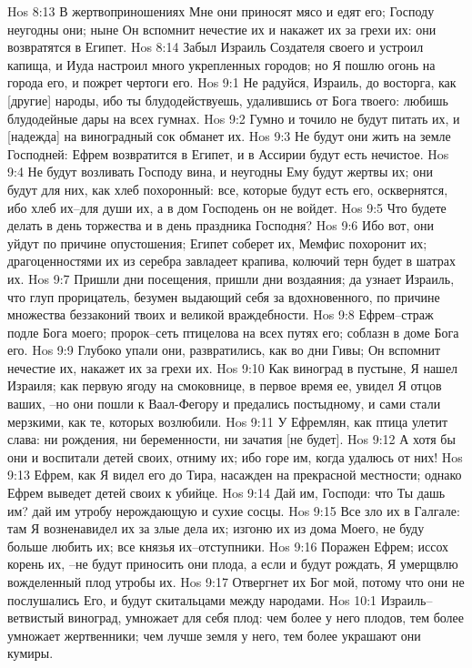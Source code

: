 Hos 8:13  В жертвоприношениях Мне они приносят мясо и едят его; Господу неугодны они; ныне Он вспомнит нечестие их и накажет их за грехи их: они возвратятся в Египет.
Hos 8:14  Забыл Израиль Создателя своего и устроил капища, и Иуда настроил много укрепленных городов; но Я пошлю огонь на города его, и пожрет чертоги его.
Hos 9:1  Не радуйся, Израиль, до восторга, как [другие] народы, ибо ты блудодействуешь, удалившись от Бога твоего: любишь блудодейные дары на всех гумнах.
Hos 9:2  Гумно и точило не будут питать их, и [надежда] на виноградный сок обманет их.
Hos 9:3  Не будут они жить на земле Господней: Ефрем возвратится в Египет, и в Ассирии будут есть нечистое.
Hos 9:4  Не будут возливать Господу вина, и неугодны Ему будут жертвы их; они будут для них, как хлеб похоронный: все, которые будут есть его, осквернятся, ибо хлеб их--для души их, а в дом Господень он не войдет.
Hos 9:5  Что будете делать в день торжества и в день праздника Господня?
Hos 9:6  Ибо вот, они уйдут по причине опустошения; Египет соберет их, Мемфис похоронит их; драгоценностями их из серебра завладеет крапива, колючий терн будет в шатрах их.
Hos 9:7  Пришли дни посещения, пришли дни воздаяния; да узнает Израиль, что глуп прорицатель, безумен выдающий себя за вдохновенного, по причине множества беззаконий твоих и великой враждебности.
Hos 9:8  Ефрем--страж подле Бога моего; пророк--сеть птицелова на всех путях его; соблазн в доме Бога его.
Hos 9:9  Глубоко упали они, развратились, как во дни Гивы; Он вспомнит нечестие их, накажет их за грехи их.
Hos 9:10  Как виноград в пустыне, Я нашел Израиля; как первую ягоду на смоковнице, в первое время ее, увидел Я отцов ваших, --но они пошли к Ваал-Фегору и предались постыдному, и сами стали мерзкими, как те, которых возлюбили.
Hos 9:11  У Ефремлян, как птица улетит слава: ни рождения, ни беременности, ни зачатия [не будет].
Hos 9:12  А хотя бы они и воспитали детей своих, отниму их; ибо горе им, когда удалюсь от них!
Hos 9:13  Ефрем, как Я видел его до Тира, насажден на прекрасной местности; однако Ефрем выведет детей своих к убийце.
Hos 9:14  Дай им, Господи: что Ты дашь им? дай им утробу нерождающую и сухие сосцы.
Hos 9:15  Все зло их в Галгале: там Я возненавидел их за злые дела их; изгоню их из дома Моего, не буду больше любить их; все князья их--отступники.
Hos 9:16  Поражен Ефрем; иссох корень их, --не будут приносить они плода, а если и будут рождать, Я умерщвлю вожделенный плод утробы их.
Hos 9:17  Отвергнет их Бог мой, потому что они не послушались Его, и будут скитальцами между народами.
Hos 10:1  Израиль--ветвистый виноград, умножает для себя плод: чем более у него плодов, тем более умножает жертвенники; чем лучше земля у него, тем более украшают они кумиры.

